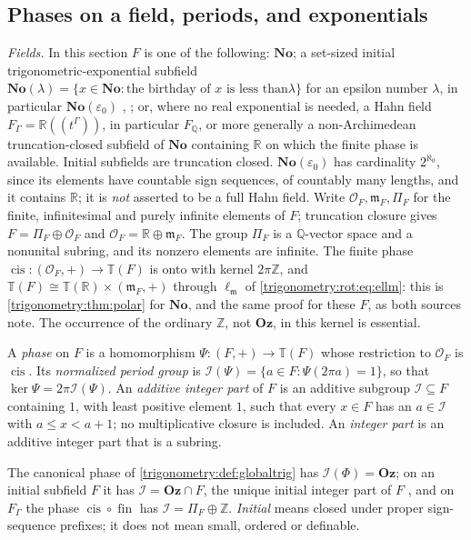 \documentclass[11pt,letterpaper]{article}
\numberwithin{equation}{section}
\theoremstyle{definition}
\theoremstyle{remark}
\newcommand{\No}{\mathbf{No}}
\newcommand{\Oz}{\mathbf{Oz}}
\newcommand{\R}{\mathbb R}
\newcommand{\Q}{\mathbb Q}
\newcommand{\Z}{\mathbb Z}
\newcommand{\OO}{\mathcal O}
\newcommand{\mm}{\mathfrak m}
\newcommand{\TT}{\mathbb T}
\newcommand{\eps}{\varepsilon}
\newcommand{\fin}{\operatorname{fin}}
\newcommand{\cis}{\operatorname{cis}}
\newcommand{\ellm}{\ell_{\mm}}
\newcommand{\cI}{\mathcal I}
\begin{document}
\subsection{Phases on a field, periods, and exponentials}\label{trigonometry:per:sec:phases}
\emph{Fields.} In this section $F$ is one of the following: $\No$; a set-sized initial
trigonometric-exponential subfield $\No(\lambda)=\{x\in\No:\text{the birthday of $x$ is less than
$\lambda$}\}$ for an epsilon number $\lambda$, in particular $\No(\eps_0)$
\cite[\S11.2, Theorem 11.1]{EK}, \cite{vdDE}; or, where no real exponential is needed, a Hahn field
$F_\Gamma=\R((t^\Gamma))$, in particular $F_{\Q}$, or more generally a non-Archimedean
truncation-closed subfield of $\No$ containing $\R$ on which the finite phase is available. Initial
subfields are truncation closed. $\No(\eps_0)$ has cardinality $2^{\aleph_0}$, since its elements have
countable sign sequences, of countably many lengths, and it contains $\R$; it is \emph{not} asserted to
be a full Hahn field. Write $\OO_F,\mm_F,\Pi_F$ for the finite, infinitesimal and purely infinite
elements of $F$; truncation closure gives $F=\Pi_F\oplus\OO_F$ and $\OO_F=\R\oplus\mm_F$. The group
$\Pi_F$ is a $\Q$-vector space and a nonunital subring, and its nonzero elements are infinite. The
finite phase $\cis:(\OO_F,+)\to\TT(F)$ is onto with kernel $2\pi\Z$, and
$\TT(F)\cong\TT(\R)\times(\mm_F,+)$ through $\ellm$ of \cref{trigonometry:rot:eq:ellm}: this is
\cref{trigonometry:thm:polar} for $\No$, and the same proof for these $F$, as both sources note. The
occurrence of the ordinary $\Z$, not $\Oz$, in this kernel is essential.

\begin{definition}\label{trigonometry:per:def:periodgroup}
A \emph{phase} on $F$ is a homomorphism $\Psi:(F,+)\to\TT(F)$ whose restriction to $\OO_F$ is
$\cis$. Its \emph{normalized period group} is $\cI(\Psi)=\{a\in F:\Psi(2\pi a)=1\}$, so that
$\ker\Psi=2\pi\cI(\Psi)$. An \emph{additive integer part} of $F$ is an additive subgroup
$\cI\subseteq F$ containing $1$, with least positive element $1$, such that every $x\in F$ has an
$a\in\cI$ with $a\le x<a+1$; no multiplicative closure is included. An \emph{integer part} is an
additive integer part that is a subring.
\end{definition}
The canonical phase of \cref{trigonometry:def:globaltrig} has $\cI(\Phi)=\Oz$; on an initial subfield
$F$ it has $\cI=\Oz\cap F$, the unique initial integer part of $F$ \cite[Lemma 11.1]{EK}, and on
$F_\Gamma$ the phase $\cis\circ\fin$ has $\cI=\Pi_F\oplus\Z$. \emph{Initial} means closed under
proper sign-sequence prefixes; it does not mean small, ordered or definable.
\end{document}
